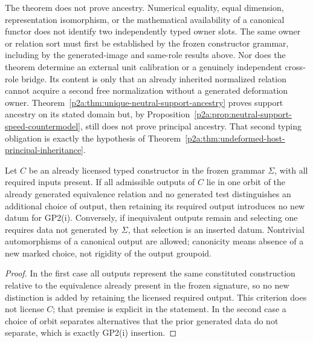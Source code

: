 \documentclass[12pt,a4paper]{article}
\begin{document}
\begin{remark}
\label{p2:rem:generated-owner-normalization-firewall}
The theorem does not prove ancestry.  Numerical equality, equal dimension,
representation isomorphism, or the mathematical availability of a canonical
functor does not identify two independently typed owner slots.  The same owner
or relation sort must first be established by the frozen constructor grammar,
including by the generated-image and same-role results above.  Nor does the
theorem determine an external unit calibration or a genuinely independent
cross-role bridge.  Its content is only that an already inherited normalized
relation cannot acquire a second free normalization without a generated
deformation owner.  Theorem~\ref{p2a:thm:unique-neutral-support-ancestry}
proves support ancestry on its stated domain but, by
Proposition~\ref{p2a:prop:neutral-support-speed-countermodel}, still does not
prove principal ancestry.  That second typing obligation is exactly the
hypothesis of
Theorem~\ref{p2a:thm:undeformed-host-principal-inheritance}.
\end{remark}

\begin{lemma}
\label{p2:lem:gp2-canonical-construction}
Let \(C\) be an already licensed typed constructor in the frozen grammar
\(\Sigma\), with all required inputs present.  If all admissible outputs of
\(C\) lie in one orbit of the
already generated equivalence relation and no generated test distinguishes an
additional choice of output, then retaining its required output introduces no new datum for
GP2(i).  Conversely, if inequivalent outputs remain and selecting one requires
data not generated by \(\Sigma\), that selection is an inserted datum.
Nontrivial automorphisms of a canonical output are allowed; canonicity means
absence of a new marked choice, not rigidity of the output groupoid.
\end{lemma}

\begin{proof}
In the first case all outputs represent the same constituted construction
relative to the equivalence already present in the frozen signature, so no
new distinction is added by retaining the licensed required output.  This
criterion does not license \(C\); that premise is explicit in the statement.
In the second case
a choice of orbit separates alternatives that the prior generated data do not
separate, which is exactly GP2(i) insertion.
\end{proof}
\end{document}
